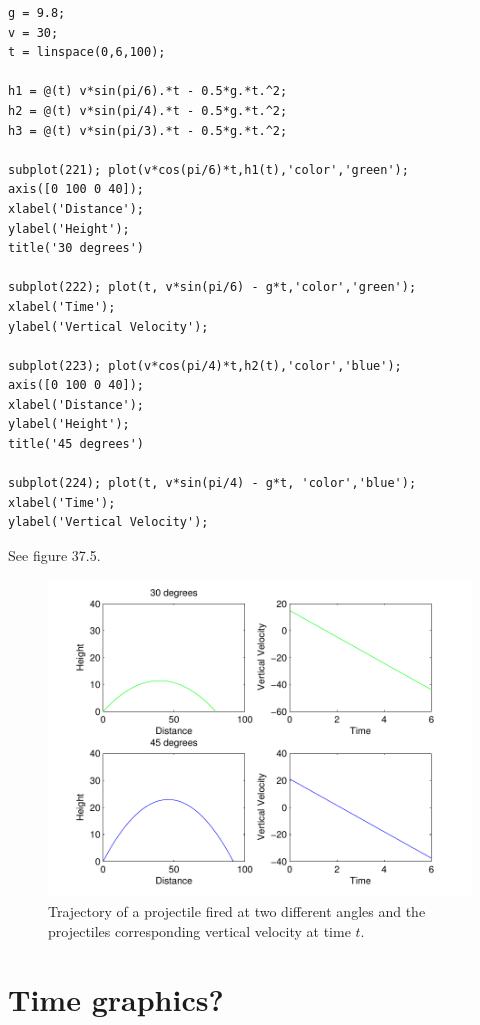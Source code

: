 \begin{matlab}
\begin{lstlisting}[style=matlab]
g = 9.8;
v = 30;
t = linspace(0,6,100);

h1 = @(t) v*sin(pi/6).*t - 0.5*g.*t.^2;
h2 = @(t) v*sin(pi/4).*t - 0.5*g.*t.^2;
h3 = @(t) v*sin(pi/3).*t - 0.5*g.*t.^2;

subplot(221); plot(v*cos(pi/6)*t,h1(t),'color','green'); 
axis([0 100 0 40]);
xlabel('Distance');
ylabel('Height');
title('30 degrees')

subplot(222); plot(t, v*sin(pi/6) - g*t,'color','green');
xlabel('Time');
ylabel('Vertical Velocity');

subplot(223); plot(v*cos(pi/4)*t,h2(t),'color','blue');
axis([0 100 0 40]);
xlabel('Distance');
ylabel('Height');
title('45 degrees')

subplot(224); plot(t, v*sin(pi/4) - g*t, 'color','blue');
xlabel('Time');
ylabel('Vertical Velocity');

\end{lstlisting}
\end{matlab}

See figure 37.5.

\begin{figure}
\begin{center}
\begin{matlab}
\includegraphics[scale=0.5]{./FiguresMAT/plot5}
\end{matlab}
\caption{Trajectory of a projectile fired at two different angles and the projectiles corresponding vertical velocity at time $t$.}
\end{center}
\end{figure}

\section{Time graphics?}



